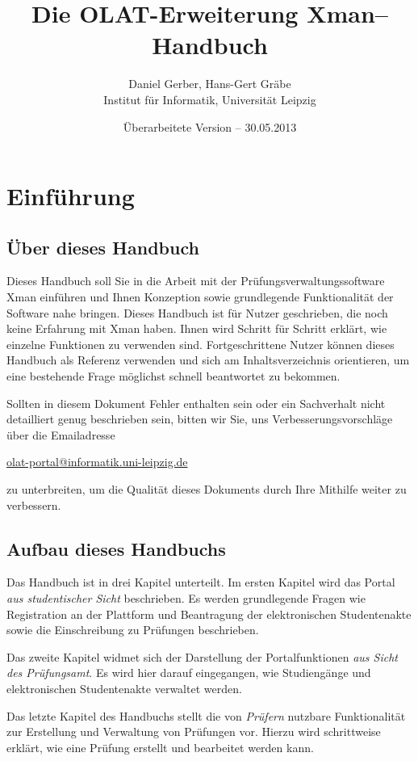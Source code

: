 \documentclass[a4paper,11pt]{article}
\author{Daniel Gerber, Hans-Gert Gräbe\\ 
Institut für Informatik, Universität Leipzig}
\title{Die OLAT-Erweiterung Xman-- Handbuch}
\date{Überarbeitete Version -- 30.05.2013}
\begin{document}
\maketitle

\tableofcontents

\section*{Einführung}

\subsection*{Über dieses Handbuch}

Dieses Handbuch soll Sie in die Arbeit mit der Prüfungsverwaltungssoftware
Xman einführen und Ihnen Konzeption sowie grundlegende Funktionalität der
Software nahe bringen. Dieses Handbuch ist für Nutzer geschrieben, die noch
keine Erfahrung mit Xman haben. Ihnen wird Schritt für Schritt erklärt, wie
einzelne Funktionen zu verwenden sind.  Fortgeschrittene Nutzer können dieses
Handbuch als Referenz verwenden und sich am Inhaltsverzeichnis orientieren, um
eine bestehende Frage möglichst schnell beantwortet zu bekommen.

Sollten in diesem Dokument Fehler enthalten sein oder ein Sachverhalt nicht
detailliert genug beschrieben sein, bitten wir Sie, uns
Verbesserungsvorschläge über die Emailadresse
\begin{center}
  \url{olat-portal@informatik.uni-leipzig.de} 
\end{center}
zu unterbreiten, um die Qualität dieses Dokuments durch Ihre Mithilfe weiter
zu verbessern.

\subsection*{Aufbau dieses Handbuchs}

Das Handbuch ist in drei Kapitel unterteilt. Im ersten Kapitel wird das Portal
{\em aus studentischer Sicht} beschrieben. Es werden
grundlegende Fragen wie Registration an der Plattform und Beantragung der
elektronischen Studentenakte sowie die Einschreibung zu Prüfungen beschrieben.

Das zweite Kapitel widmet sich der Darstellung der Portalfunktionen {\em aus
Sicht des Prüfungsamt}. Es wird hier darauf eingegangen,
wie Studiengänge und elektronischen Studentenakte verwaltet werden.

Das letzte Kapitel des Handbuchs stellt die von {\em Prüfern}
nutzbare Funktionalität zur Erstellung und Verwaltung von Prüfungen vor.
Hierzu wird schrittweise erklärt, wie eine Prüfung erstellt und bearbeitet
werden kann.
\end{document}
